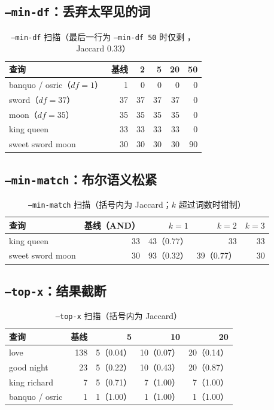 \subsection{\texttt{--min-df}：丢弃太罕见的词}

\begin{table}[H]
  \centering
  \caption{\texttt{--min-df} 扫描（最后一行为 \texttt{--min-df 50} 时仅剩 ，Jaccard 0.33）}
  \label{tab:min-df}
  \small
  \begin{tabularx}{\linewidth}{@{}X r r r r r@{}}
    \toprule
    查询 & 基线 & 2 & 5 & 20 & 50 \\
    \midrule
    banquo / osric（$df=1$） & 1 & 0 & 0 & 0 & 0 \\
    sword（$df=37$） & 37 & 37 & 37 & 37 & 0 \\
    moon（$df=35$） & 35 & 35 & 35 & 35 & 0 \\
    king queen & 33 & 33 & 33 & 33 & 0 \\
    sweet sword moon & 30 & 30 & 30 & 30 & 90 \\
    \bottomrule
  \end{tabularx}
\end{table}

\subsection{\texttt{--min-match}：布尔语义松紧}

\begin{table}[H]
  \centering
  \caption{\texttt{--min-match} 扫描（括号内为 Jaccard；$k$ 超过词数时钳制）}
  \label{tab:min-match}
  \small
  \begin{tabularx}{\linewidth}{@{}X r r r r@{}}
    \toprule
    查询 & 基线（AND） & $k=1$ & $k=2$ & $k=3$ \\
    \midrule
    king queen & 33 & 43（0.77） & 33 & 33 \\
    sweet sword moon & 30 & 93（0.32） & 39（0.77） & 30 \\
    \bottomrule
  \end{tabularx}
\end{table}

\subsection{\texttt{--top-x}：结果截断}

\begin{table}[H]
  \centering
  \caption{\texttt{--top-x} 扫描（括号内为 Jaccard）}
  \label{tab:top-x}
  \small
  \begin{tabularx}{\linewidth}{@{}X r r r r@{}}
    \toprule
    查询 & 基线 & 5 & 10 & 20 \\
    \midrule
    love & 138 & 5（0.04） & 10（0.07） & 20（0.14） \\
    good night & 23 & 5（0.22） & 10（0.43） & 20（0.87） \\
    king richard & 7 & 5（0.71） & 7（1.00） & 7（1.00） \\
    banquo / osric & 1 & 1（1.00） & 1（1.00） & 1（1.00） \\
    \bottomrule
  \end{tabularx}
\end{table}

